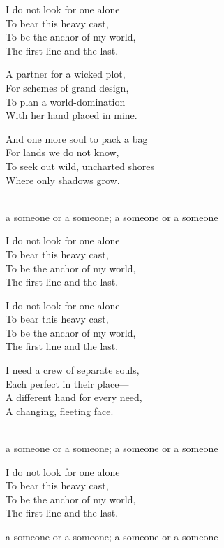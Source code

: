 \begin{lyrics}
I do not look for one alone\\
To bear this heavy cast,\\
To be the anchor of my world,\\
The first line and the last.

A partner for a wicked plot,\\
For schemes of grand design,\\
To plan a world-domination\\
With her hand placed in mine.

And one more soul to pack a bag\\
For lands we do not know,\\
To seek out wild, uncharted shores\\
Where only shadows grow.

\\
a someone or a someone; a someone or a someone

I do not look for one alone\\
To bear this heavy cast,\\
To be the anchor of my world,\\
The first line and the last.

I do not look for one alone\\
To bear this heavy cast,\\
To be the anchor of my world,\\
The first line and the last.

I need a crew of separate souls,\\
Each perfect in their place—\\
A different hand for every need,\\
A changing, fleeting face.

\\
a someone or a someone; a someone or a someone

I do not look for one alone\\
To bear this heavy cast,\\
To be the anchor of my world,\\
The first line and the last.

a someone or a someone; a someone or a someone
\end{lyrics}

